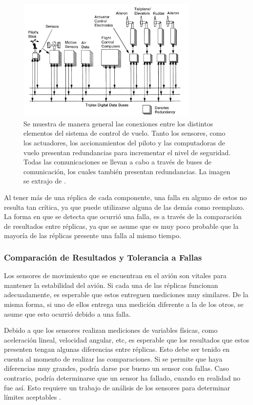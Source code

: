 \begin{figure}[H]
    \centering
    \includegraphics[width=0.8\textwidth]{img/diagrama_general_fly_by_wire.png}
    \caption{Se muestra de manera general las conexiones entre los distintos elementos del sistema de control de vuelo. Tanto los sensores, como los actuadores, los accionamientos del piloto y las computadoras de vuelo presentan redundancias para incrementar el nivel de seguridad. Todas las comunicaciones se llevan a cabo a través de buses de comunicación, los cuales también presentan redundancias. La imagen se extrajo de \cite{collinson2023introduction}.}
    \label{fig:diagrama_general_fly_by_wire}    
\end{figure}

Al tener más de una réplica de cada componente, una falla en alguno de estos no resulta tan crítica, ya que puede utilizarse alguna de las demás como reemplazo. La forma en que se detecta que ocurrió una falla, es a través de la comparación de resultados entre réplicas, ya que se asume que es muy poco probable que la mayoría de las réplicas presente una falla al mismo tiempo.

\subsubsection{Comparación de Resultados y Tolerancia a Fallas}

Los sensores de movimiento que se encuentran en el avión son vitales para mantener la estabilidad del avión. Si cada una de las réplicas funcionan adecuadamente, es esperable que estos entreguen mediciones muy similares. De la misma forma, si uno de ellos entrega una medición diferente a la de los otros, se asume que esto ocurrió debido a una falla.

Debido a que los sensores realizan mediciones de variables físicas, como aceleración lineal, velocidad angular, etc, es esperable que los resultados que estos presenten tengan algunas diferencias entre réplicas. Esto debe ser tenido en cuenta al momento de realizar las comparaciones. Si se permite que haya diferencias muy grandes, podría darse por bueno un sensor con fallas. Caso contrario, podría determinarse que un sensor ha fallado, cuando en realidad no fue así. Esto requiere un trabajo de análisis de los sensores para determinar límites aceptables \cite{lala1994architectural}.

